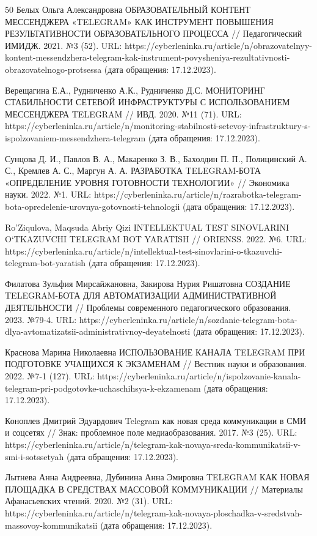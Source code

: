 \documentclass{article}
\begin{document}
\begin{thebibliography} {50}
Белых Ольга Александровна ОБРАЗОВАТЕЛЬНЫЙ КОНТЕНТ МЕССЕНДЖЕРА «TELEGRAM» КАК ИНСТРУМЕНТ ПОВЫШЕНИЯ РЕЗУЛЬТАТИВНОСТИ ОБРАЗОВАТЕЛЬНОГО ПРОЦЕССА // Педагогический ИМИДЖ. 2021. №3 (52). URL: https://cyberleninka.ru/article/n/obrazovatelnyy-kontent-messendzhera-telegram-kak-instrument-povysheniya-rezultativnosti-obrazovatelnogo-protsessa (дата обращения: 17.12.2023).

Верещагина Е.А., Рудниченко А.К., Рудниченко Д.С. МОНИТОРИНГ СТАБИЛЬНОСТИ СЕТЕВОЙ ИНФРАСТРУКТУРЫ С ИСПОЛЬЗОВАНИЕМ МЕССЕНДЖЕРА TELEGRAM // ИВД. 2020. №11 (71). URL: https://cyberleninka.ru/article/n/monitoring-stabilnosti-setevoy-infrastruktury-s-ispolzovaniem-messendzhera-telegram (дата обращения: 17.12.2023).

Сунцова Д. И., Павлов В. А., Макаренко З. В., Бахолдин П. П., Полицинский А. С., Кремлев А. С., Маргун А. А. РАЗРАБОТКА TELEGRAM-БОТА «ОПРЕДЕЛЕНИЕ УРОВНЯ ГОТОВНОСТИ ТЕХНОЛОГИИ» // Экономика науки. 2022. №1. URL: https://cyberleninka.ru/article/n/razrabotka-telegram-bota-opredelenie-urovnya-gotovnosti-tehnologii (дата обращения: 17.12.2023).

Ro’Ziqulova, Maqsuda Abriy Qizi INTELLEKTUAL TEST SINOVLARINI O‘TKAZUVCHI TELEGRAM BOT YARATISH // ORIENSS. 2022. №6. URL: https://cyberleninka.ru/article/n/intellektual-test-sinovlarini-o-tkazuvchi-telegram-bot-yaratish (дата обращения: 17.12.2023).

Филатова Зульфия Мирсайжановна, Закирова Нурия Ришатовна СОЗДАНИЕ TELEGRAM-БОТА ДЛЯ АВТОМАТИЗАЦИИ АДМИНИСТРАТИВНОЙ ДЕЯТЕЛЬНОСТИ // Проблемы современного педагогического образования. 2023. №79-4. URL: https://cyberleninka.ru/article/n/sozdanie-telegram-bota-dlya-avtomatizatsii-administrativnoy-deyatelnosti (дата обращения: 17.12.2023).

Краснова Марина Николаевна ИСПОЛЬЗОВАНИЕ КАНАЛА TELEGRAM ПРИ ПОДГОТОВКЕ УЧАЩИХСЯ К ЭКЗАМЕНАМ // Вестник науки и образования. 2022. №7-1 (127). URL: https://cyberleninka.ru/article/n/ispolzovanie-kanala-telegram-pri-podgotovke-uchaschihsya-k-ekzamenam (дата обращения: 17.12.2023).

Коноплев Дмитрий Эдуардович Telegram как новая среда коммуникации в СМИ и соцсетях // Знак: проблемное поле медиаобразования. 2017. №3 (25). URL: https://cyberleninka.ru/article/n/telegram-kak-novaya-sreda-kommunikatsii-v-smi-i-sotssetyah (дата обращения: 17.12.2023).

Лытнева Анна Андреевна, Дубинина Анна Эмировна TELEGRAM КАК НОВАЯ ПЛОЩАДКА В СРЕДСТВАХ МАССОВОЙ КОММУНИКАЦИИ // Материалы Афанасьевских чтений. 2020. №2 (31). URL: https://cyberleninka.ru/article/n/telegram-kak-novaya-ploschadka-v-sredstvah-massovoy-kommunikatsii (дата обращения: 17.12.2023).


\end{thebibliography}
\end{document}
